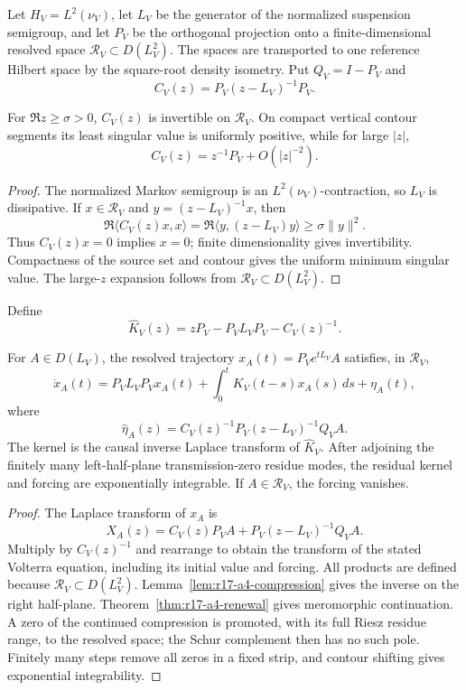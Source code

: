 Let \(H_V=L^2(\nu_V)\), let \(L_V\) be the generator of the normalized
suspension semigroup, and let \(P_V\) be the orthogonal projection onto a
finite-dimensional resolved space \(\mathcal R_V\subset D(L_V^2)\).  The
spaces are transported to one reference Hilbert space by the square-root
density isometry.  Put \(Q_V=I-P_V\) and
\[
 C_V(z)=P_V(z-L_V)^{-1}P_V.
\]

\begin{lemma}
\label{lem:r17-a4-compression}
For \(\Re z\ge\sigma>0\), \(C_V(z)\) is invertible on \(\mathcal R_V\).  On
compact vertical contour segments its least singular value is uniformly
positive, while for large \(|z|\),
\[
 C_V(z)=z^{-1}P_V+O(|z|^{-2}).
\]
\end{lemma}

\begin{proof}
The normalized Markov semigroup is an \(L^2(\nu_V)\)-contraction, so \(L_V\)
is dissipative.  If \(x\in\mathcal R_V\) and
\(y=(z-L_V)^{-1}x\), then
\[
 \Re\langle C_V(z)x,x\rangle
 =\Re\langle y,(z-L_V)y\rangle
 \ge\sigma\|y\|^2.
\]
Thus \(C_V(z)x=0\) implies \(x=0\); finite dimensionality gives
invertibility.  Compactness of the source set and contour gives the uniform
minimum singular value.  The large-\(z\) expansion follows from
\(\mathcal R_V\subset D(L_V^2)\).
\end{proof}

Define
\[
 \widehat K_V(z)=zP_V-P_VL_VP_V-C_V(z)^{-1}.
\]

\begin{theorem}
\label{thm:r17-a4-memory}
For \(A\in D(L_V)\), the resolved trajectory
\(x_A(t)=P_Ve^{tL_V}A\) satisfies, in \(\mathcal R_V\),
\[
 \dot x_A(t)=P_VL_VP_Vx_A(t)
 +\int_0^tK_V(t-s)x_A(s)\,ds+\eta_A(t),
\]
where
\[
 \widehat\eta_A(z)=C_V(z)^{-1}
 P_V(z-L_V)^{-1}Q_VA.
\]
The kernel is the causal inverse Laplace transform of
\(\widehat K_V\).  After adjoining the finitely many left-half-plane
transmission-zero residue modes, the residual kernel and forcing are
exponentially integrable.  If \(A\in\mathcal R_V\), the forcing vanishes.
\end{theorem}

\begin{proof}
The Laplace transform of \(x_A\) is
\[
 X_A(z)=C_V(z)P_VA+P_V(z-L_V)^{-1}Q_VA.
\]
Multiply by \(C_V(z)^{-1}\) and rearrange to obtain the transform of the
stated Volterra equation, including its initial value and forcing.  All
products are defined because \(\mathcal R_V\subset D(L_V^2)\).
Lemma~\ref{lem:r17-a4-compression} gives the inverse on the right half-plane.
Theorem~\ref{thm:r17-a4-renewal} gives meromorphic continuation.  A zero of the
continued compression is promoted, with its full Riesz residue range, to the
resolved space; the Schur complement then has no such pole.  Finitely many
steps remove all zeros in a fixed strip, and contour shifting gives
exponential integrability.
\end{proof}

